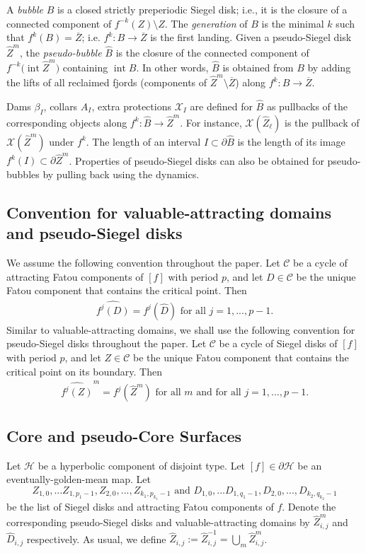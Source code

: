 \documentclass[11pt, reqno]{amsart}
\numberwithin{equation}{section}
\theoremstyle{plain}
\theoremstyle{theorem}
\theoremstyle{plain}
\theoremstyle{definition}
\numberwithin{figure}{section}
\newcommand\XX{\mathcal{X}}
\newcommand\intr{\operatorname{int}}
\newcommand{\wZ}{{\widehat Z}}
\begin{document}
 A \emph{bubble} $B$ is a closed strictly preperiodic Siegel disk; i.e., it is the closure of a connected component of $f^{-k}(Z)\setminus Z$. The \emph{generation} of $B$ is the minimal $k$ such that $f^k(B)=\overline Z$; i.e. $f^k\colon B\to \overline Z$ is the first landing. Given a pseudo-Siegel disk $\widehat Z^m$, the \emph{pseudo-bubble} $\widehat B$ is the closure of the connected component of $f^{-k}\big( \intr \widehat Z^m\big)$ containing $\intr B$. In other words, $\widehat B$ is obtained from $B$ by adding the lifts of all reclaimed fjords (components of $\widehat Z^m\setminus \overline Z$) along $f^k\colon B\to \overline Z$.

Dams $\beta_I$, collars $A_I$, extra protections $\XX_I$ are defined for $\widehat B$ as pullbacks of the corresponding objects along $f^k\colon \widehat B \to  \wZ^m$. 
For instance, $\XX(\wZ_\ell)$ is the pullback of $\XX(\wZ^m)$ under $f^k$. 
The length of an interval $I\subset \partial \widehat B$ is the length of its image $f^k(I)\subset \partial \wZ^m$. 
Properties of pseudo-Siegel disks can also be obtained for pseudo-bubbles by pulling back using the dynamics.


\subsection{Convention for valuable-attracting domains and pseudo-Siegel disks}
We assume the following convention throughout the paper.
Let $\mathcal{C}$ be a cycle of attracting Fatou components of $[f]$ with period $p$, and let $D \in \mathcal{C}$ be the unique Fatou component that contains the critical point.
Then
\begin{align}\label{eq:cvd}
\widehat{f^j(D)} = f^j(\widehat D)  \text{ for all $j = 1, ..., p-1$}.
\end{align}
Similar to valuable-attracting domains, we shall use the following convention for pseudo-Siegel disks throughout the paper.
Let $\mathcal{C}$ be a cycle of Siegel disks of $[f]$ with period $p$, and let $Z \in \mathcal{C}$ be the unique Fatou component that contains the critical point on its boundary.
Then
\begin{align}\label{eq:cvz}
\widehat {f^j(Z)}^m = f^j(\widehat Z^m)  \text{ for all $m$ and for all $j = 1, ..., p-1$}.
\end{align}

\subsection{Core and pseudo-Core Surfaces}\label{ss:CoreSurfaces}
Let $\mathcal{H}$ be a hyperbolic component of disjoint type.
Let $[f]\in \partial \mathcal{H}$ be an eventually-golden-mean map.
Let
$$
Z_{1,0},... Z_{1,p_1-1}, Z_{2, 0},..., Z_{k_1, p_{k_1}-1} \text{ and } D_{1,0},... D_{1,q_1-1}, D_{2, 0},..., D_{k_2, q_{k_2}-1}
$$
be the list of Siegel disks and attracting Fatou components of $f$.
Denote the corresponding pseudo-Siegel disks and valuable-attracting domains by $\widehat Z_{i,j}^m$ and $\widehat D_{i,j}$ respectively.
As usual, we define $\widehat Z_{i,j} := \widehat Z_{i,j}^{-1} = \bigcup_m \widehat Z_{i,j}^m$.
\end{document}
